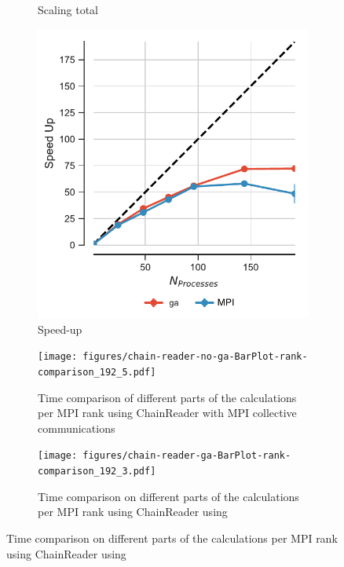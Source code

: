 \begin{figure}[!htb]
\begin{subfigure}{.3\textwidth}
  \caption{Scaling total}
  \label{fig:MPItottime-chain-reader}
\end{subfigure}
\hfill
\begin{subfigure}{.3\textwidth}
  \includegraphics[width=\linewidth]{figures/Comparison_Speed_UP_traj_splitting-chain-reader_edited.pdf}
  \caption{Speed-up}
  \label{fig:MPIspeedup-chain-reader}
\end{subfigure}
\bigskip

\begin{subfigure}{.45\textwidth}
  \texttt{[image: figures/chain-reader-no-ga-BarPlot-rank-comparison\_192\_5.pdf]}
  \captionsetup{format=hang}
   \caption{Time comparison of different parts of the calculations per MPI rank using ChainReader with MPI collective communications}
  \label{fig:MPIranks-split-chain-reader}
\end{subfigure}
\hfill
\begin{subfigure}{.45\textwidth}
  \texttt{[image: figures/chain-reader-ga-BarPlot-rank-comparison\_192\_3.pdf]}
  \captionsetup{format=hang}
  \caption{Time comparison on different parts of the calculations per MPI rank using ChainReader using }
  \label{fig:MPIranks-split-ga-chain-reader}
\end{subfigure}


\end{figure}
